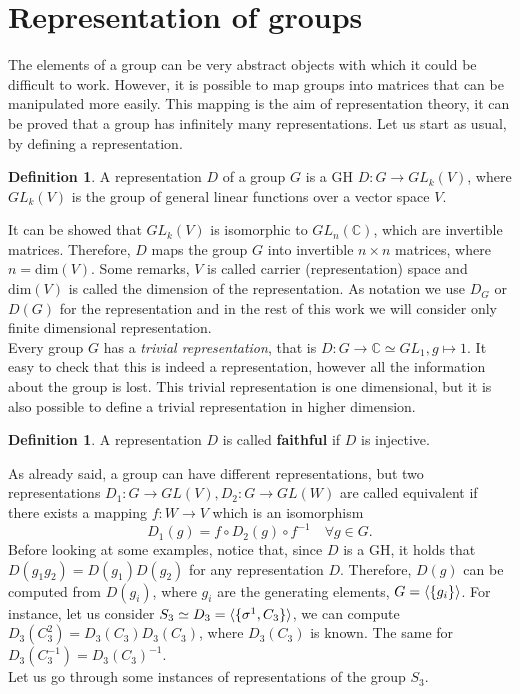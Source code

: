 \documentclass[12pt]{book}
\theoremstyle{plain}
\newcommand{\C}{\mathbb{C}}
\theoremstyle{definition}
\newtheorem{dfn}[thm]{Definition}
\theoremstyle{remark}
\begin{document}
\section{Representation of groups}
The elements of a group can be very abstract objects with which it could be difficult to work. However, it is possible to map groups into matrices that can be manipulated more easily. This mapping is the aim of representation theory, it can be proved that a group has infinitely many representations. Let us start as usual, by defining a representation.
\begin{dfn}
A representation $D$ of a group $G$ is a GH $D:G\to GL_k(V)$, where $GL_k(V)$ is the group of general linear functions over a vector space $V$. 
\end{dfn} 
It can be showed that $GL_k(V)$ is isomorphic to $GL_n(\C)$, which are invertible matrices. Therefore, $D$ maps the group $G$ into invertible $n\times n$ matrices, where $n= \text{dim}(V)$.
Some remarks, $V$ is called carrier (representation) space and $\text{dim}(V)$ is called the dimension of the representation. As notation we use $D_G$ or $D(G)$ for the representation and in the rest of this work we will consider only finite dimensional representation. \\
Every group $G$ has a \emph{trivial representation}, that is $D:G\to \C \simeq GL_1,g\mapsto 1$. It easy to check that this is indeed a representation, however all the information about the group is lost. This trivial representation is one dimensional, but it is also possible to define a trivial representation in higher dimension.
\begin{dfn}
A representation $D$ is called \textbf{faithful} if $D$ is injective.
\end{dfn}
As already said, a group can have different representations, but two representations  $D_1:G\to GL(V),D_2:G\to GL(W)$ are called equivalent if there exists a mapping $f:W\to V$ which is an isomorphism
\[D_1(g) = f\circ D_2(g)\circ f^{-1}\quad \forall g\in G.\]
Before looking at some examples, notice that, since $D$ is a GH, it holds that $D(g_1g_2)=D(g_1)D(g_2)$ for any representation $D$. Therefore, $D(g)$ can be computed from $D(g_i)$, where $g_i$ are the generating elements, $G =\braket{\{g_i\}}$. For instance, let us consider $S_3 \simeq D_3 = \braket{\{\sigma^1,C_3\}}$, we can compute $D_3(C_3^2) = D_3(C_3)D_3(C_3)$, where $D_3(C_3)$ is known. The same for $D_3(C_3^{-1})=D_3(C_3)^{-1}$. \\
Let us go through some instances of representations of the group $S_3$.
\end{document}
